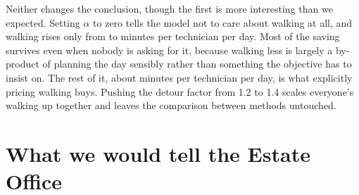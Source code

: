\documentclass[11pt]{article}
\newcommand{\num}[1]{#1}
\begin{document}
\begin{table}[h]\centering\small

\caption{Varying the two most arbitrary assumptions in the model.}
\label{tab:sens}
\end{table}

Neither changes the conclusion, though the first is more interesting than we
expected. Setting $\alpha$ to zero tells the model not to care about walking
at all, and walking rises only from \NImpTravel{} to \NAlphaZeroTravel{}
minutes per technician per day. Most of the saving survives even when nobody
is asking for it, because walking less is largely a by-product of planning the
day sensibly rather than something the objective has to insist on. The rest of
it, about \NAlphaWorthMinutes{} minutes per technician per day, is what
explicitly pricing walking buys. Pushing the detour factor from \num{1.2} to
\num{1.4} scales everyone's walking up together and leaves the comparison
between methods untouched.

\section{What we would tell the Estate Office}
\end{document}
